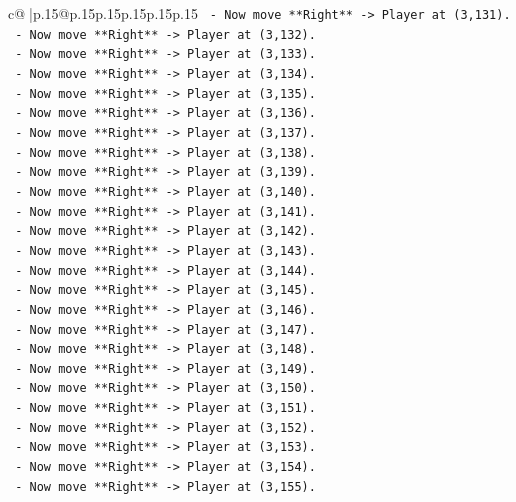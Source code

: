 \documentclass{article}
\begin{document}
{\begin{supertabular}{c@{$\;$}|p{.15\linewidth}@{}p{.15\linewidth}p{.15\linewidth}p{.15\linewidth}p{.15\linewidth}p{.15\linewidth}}
{{{\texttt{    {-}   Now move **Right** {-}> Player at (3,131).} \\
\texttt{    {-}   Now move **Right** {-}> Player at (3,132).} \\
\texttt{    {-}   Now move **Right** {-}> Player at (3,133).} \\
\texttt{    {-}   Now move **Right** {-}> Player at (3,134).} \\
\texttt{    {-}   Now move **Right** {-}> Player at (3,135).} \\
\texttt{    {-}   Now move **Right** {-}> Player at (3,136).} \\
\texttt{    {-}   Now move **Right** {-}> Player at (3,137).} \\
\texttt{    {-}   Now move **Right** {-}> Player at (3,138).} \\
\texttt{    {-}   Now move **Right** {-}> Player at (3,139).} \\
\texttt{    {-}   Now move **Right** {-}> Player at (3,140).} \\
\texttt{    {-}   Now move **Right** {-}> Player at (3,141).} \\
\texttt{    {-}   Now move **Right** {-}> Player at (3,142).} \\
\texttt{    {-}   Now move **Right** {-}> Player at (3,143).} \\
\texttt{    {-}   Now move **Right** {-}> Player at (3,144).} \\
\texttt{    {-}   Now move **Right** {-}> Player at (3,145).} \\
\texttt{    {-}   Now move **Right** {-}> Player at (3,146).} \\
\texttt{    {-}   Now move **Right** {-}> Player at (3,147).} \\
\texttt{    {-}   Now move **Right** {-}> Player at (3,148).} \\
\texttt{    {-}   Now move **Right** {-}> Player at (3,149).} \\
\texttt{    {-}   Now move **Right** {-}> Player at (3,150).} \\
\texttt{    {-}   Now move **Right** {-}> Player at (3,151).} \\
\texttt{    {-}   Now move **Right** {-}> Player at (3,152).} \\
\texttt{    {-}   Now move **Right** {-}> Player at (3,153).} \\
\texttt{    {-}   Now move **Right** {-}> Player at (3,154).} \\
\texttt{    {-}   Now move **Right** {-}> Player at (3,155).} \\
}}}
\end{supertabular}}
\end{document}
